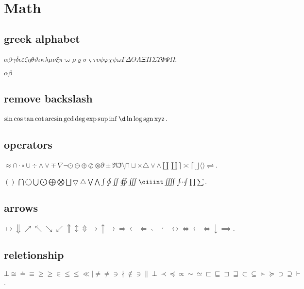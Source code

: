 \documentclass{ctexbook}
\DeclareMathOperator{\sgn}{sgn}
\begin{document}
\section{Math}
\subsection{greek alphabet}
\(\alpha\beta\gamma\delta\epsilon\varepsilon\zeta\eta\theta\vartheta\iota\kappa\lambda\mu\nu\xi\pi\varpi\rho\varrho\sigma\varsigma\tau\upsilon\phi\varphi\chi\psi\omega\Gamma\Delta\Theta\Lambda\Xi\Pi\Sigma\Upsilon\Phi\Psi\Omega\).

\(\alpha\beta\)
\subsection{remove backslash}
\(\sin \cos \tan \cot \arcsin \gcd \deg \exp \sup \inf \d \ln \log \sgn \operatorname{xyz}\).

\subsection{operators}
\(\approx \cap \cdot \circ \cup \div \land \lor \mp \nabla \neg \odot \ominus \oplus \oslash \otimes \partial \pm \Re \Im \setminus \sqcap \sqcup \times \triangle \vee \wedge \amalg \coprod \rceil \asymp \lceil \lfloor \rfloor \langle \rangle \rightleftharpoons \).

\(\left( \right)\)
\(\bigcap \bigcirc \bigcup \bigodot \bigoplus \bigotimes \bigsqcup \bigtriangledown \bigtriangleup \bigvee \bigwedge \int \oint \iint \oiint \iiint \oiiint \iiiint \idotsint \prod \sum \).

\subsection{arrows}
\(\mapsto \Downarrow \nearrow \nwarrow \searrow \swarrow \Uparrow \updownarrow \Updownarrow \to \uparrow \rightarrow \Rightarrow \leftarrow \Leftarrow \leftharpoondown \leftharpoonup \leftrightarrow \Leftrightarrow \gets \iff \downarrow \implies\).

\subsection{reletionship}
\(\bot \cong \doteq \equiv \ge \geq \in \le \leq \ll \mid \ne \neq \ni \nmid \notin \owns \parallel \perp \prec \preceq \propto \sim \simeq \sqsubset \sqsubseteq \sqsupset \sqsupseteq \subset \subseteq \succ \succeq \supset \supseteq \vdash \).
\end{document}
